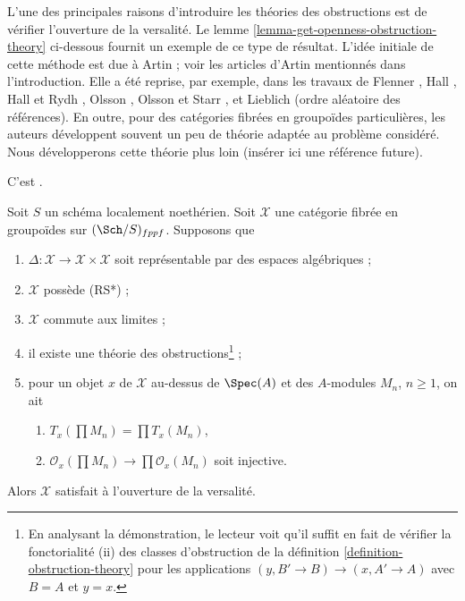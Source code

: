 \medskip\noindent
L'une des principales raisons d'introduire les théories des obstructions est
de vérifier l'ouverture de la versalité. Le lemme
\ref{lemma-get-openness-obstruction-theory} ci-dessous fournit un exemple de
ce type de résultat. L'idée initiale de cette méthode est due à Artin ; voir
les articles d'Artin mentionnés dans l'introduction. Elle a été reprise, par
exemple, dans les travaux de Flenner \cite{Flenner}, Hall
\cite{Hall-coherent}, Hall et Rydh \cite{rydh_axioms}, Olsson
\cite{olsson_deformation}, Olsson et Starr \cite{olsson-starr}, et Lieblich
\cite{lieblich-complexes} (ordre aléatoire des références). En outre, pour des
catégories fibrées en groupoïdes particulières, les auteurs développent
souvent un peu de théorie adaptée au problème considéré. Nous développerons
cette théorie plus loin (insérer ici une référence future).

\begin{lemma}
\label{lemma-get-openness-obstruction-theory}
\begin{reference}
C'est \cite[Theorem 4.4]{Hall-coherent}.
\end{reference}
Soit $S$ un schéma localement noethérien. Soit $\mathcal{X}$ une catégorie
fibrée en groupoïdes sur $(\Sch/S)_{fppf}$. Supposons que
\begin{enumerate}
\item $\Delta : \mathcal{X} \to \mathcal{X} \times \mathcal{X}$ soit
représentable par des espaces algébriques ;
\item $\mathcal{X}$ possède (RS*) ;
\item $\mathcal{X}$ commute aux limites ;
\item il existe une théorie des obstructions\footnote{En analysant la
démonstration, le lecteur voit qu'il suffit en fait de vérifier la
fonctorialité (ii) des classes d'obstruction de la définition
\ref{definition-obstruction-theory} pour les applications
$(y, B' \to B) \to (x, A' \to A)$ avec $B = A$ et $y = x$.} ;
\item pour un objet $x$ de $\mathcal{X}$ au-dessus de $\Spec(A)$ et des
$A$-modules $M_n$, $n \geq 1$, on ait
\begin{enumerate}
\item $T_x(\prod M_n) = \prod T_x(M_n)$,
\item $\mathcal{O}_x(\prod M_n) \to \prod \mathcal{O}_x(M_n)$
soit injective.
\end{enumerate}
\end{enumerate}
Alors $\mathcal{X}$ satisfait à l'ouverture de la versalité.
\end{lemma}

